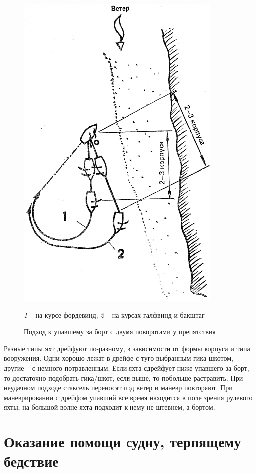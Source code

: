 \documentclass[a4paper, 12pt, twoside, final, book, russian, fittopage, cyremdash]{ncc}
\begin{document}
\begin{figure}[htb]
  \centering{}
  \includegraphics[scale=1.3]{0140P}
  \caption{Подход к упавшему за борт с двумя поворотами у препятствия}
  \label{fig:140}
  \small
  \centering{}
  \textit{1} \--- на курсе фордевинд; \textit{2} \--- на курсах галфвинд и бакштаг
\end{figure}

Разные типы яхт дрейфуют по-разному, в зависимости от формы корпуса и типа вооружения. Одни хорошо лежат в дрейфе с туго выбранным гика шкотом, другие \--- с немного потравленным. Если яхта сдрейфует ниже упавшего за борт, то достаточно подобрать гика\-/шкот, если выше, то побольше растравить. При неудачном подходе стаксель переносят под ветер и маневр повторяют. При маневрировании с дрейфом упавший все время находится в поле зрения рулевого яхты, на большой волне яхта подходит к нему не штевнем, а бортом.

\section{Оказание помощи судну, терпящему бедствие}
\end{document}
